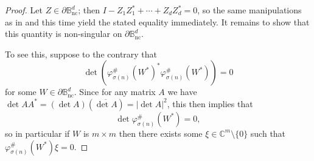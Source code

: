 \documentclass[10pt,a4paper]{amsart}
\def\BB{\mathbb{B}}
\def\CC{\mathbb{C}}
\def\nc{\mathrm{nc}}
\def\p{\varphi}
\def\s{\sigma}
\begin{document}
\begin{proof}
    Let \(Z \in \partial \BB^d_\nc\); then \(I - Z_1Z_1^* + \cdots + Z_dZ_d^* = 0\), so the same manipulations as in  and  this time yield the stated equality immediately. It remains to show that this quantity is non-singular on \(\partial \BB_\nc^d\).
    
    To see this, suppose to the contrary that
    \[
        \det \left(\p_{\s(n)}^\#(W^*)^*\p_{\s(n)}^\#(W^*)\right) = 0
    \]
    for some \(W \in \partial \BB^d_\nc\). Since for any matrix \(A\) we have \(\det AA^* = (\det A) (\overline{\det A}) = \lvert \det A \rvert^2\), this then implies that
    \[
        \det \p_{\s(n)}^\#(W^*) = 0,
    \]
    so in particular if \(W\) is \(m \times m\) then there exists some \(\xi \in \CC^{m}\setminus\{0\}\) such that \(\p_{\s(n)}^\#(W^*)\xi = 0\).


\end{proof}
\end{document}
